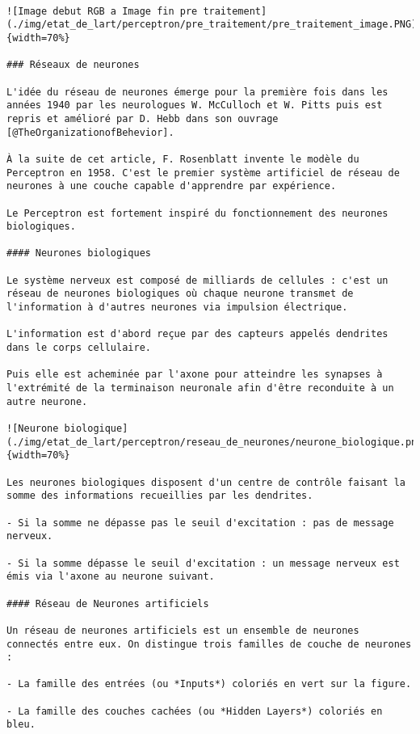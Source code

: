 \documentclass[
12pt,
french,
]{article}
\begin{document}
\begin{lstlisting}

![Image debut RGB a Image fin pre traitement](./img/etat_de_lart/perceptron/pre_traitement/pre_traitement_image.PNG){width=70%}

### Réseaux de neurones

L'idée du réseau de neurones émerge pour la première fois dans les années 1940 par les neurologues W. McCulloch et W. Pitts puis est repris et amélioré par D. Hebb dans son ouvrage [@TheOrganizationofBehevior].

À la suite de cet article, F. Rosenblatt invente le modèle du Perceptron en 1958. C'est le premier système artificiel de réseau de neurones à une couche capable d'apprendre par expérience.

Le Perceptron est fortement inspiré du fonctionnement des neurones biologiques.

#### Neurones biologiques

Le système nerveux est composé de milliards de cellules : c'est un réseau de neurones biologiques où chaque neurone transmet de l'information à d'autres neurones via impulsion électrique.

L'information est d'abord reçue par des capteurs appelés dendrites dans le corps cellulaire.

Puis elle est acheminée par l'axone pour atteindre les synapses à l'extrémité de la terminaison neuronale afin d'être reconduite à un autre neurone.

![Neurone biologique](./img/etat_de_lart/perceptron/reseau_de_neurones/neurone_biologique.png){width=70%}

Les neurones biologiques disposent d'un centre de contrôle faisant la somme des informations recueillies par les dendrites.

- Si la somme ne dépasse pas le seuil d'excitation : pas de message nerveux.

- Si la somme dépasse le seuil d'excitation : un message nerveux est émis via l'axone au neurone suivant.

#### Réseau de Neurones artificiels

Un réseau de neurones artificiels est un ensemble de neurones connectés entre eux. On distingue trois familles de couche de neurones :

- La famille des entrées (ou *Inputs*) coloriés en vert sur la figure.

- La famille des couches cachées (ou *Hidden Layers*) coloriés en bleu.


\end{lstlisting}
\end{document}
